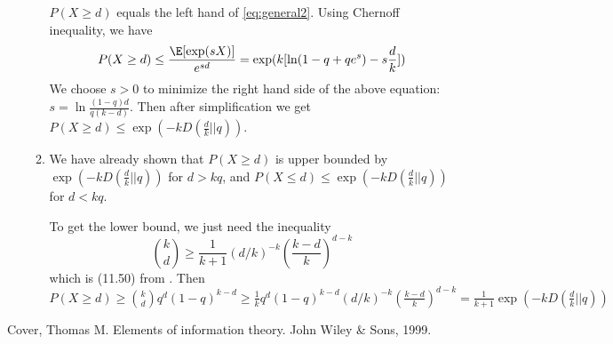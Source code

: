\documentclass{article}
\begin{document}
\begin{enumerate}
\begin{enumerate}
        $P(X \geq d)$ equals the left hand of \eqref{eq:general2}.
        Using Chernoff inequality, we have
        \begin{equation*}
            P(X\geq d) \leq \frac{\E[\exp(sX)]}{e^{sd}} = \exp(k[\ln(1-q+qe^s)-s\frac{d}{k}])
        \end{equation*}
        We choose $s>0$ to minimize the right hand side of the above equation: $s=\ln\frac{(1-q)d}{q(k-d)}$. Then after simplification
        we get $P(X\geq d) \leq \exp(-kD(\frac{d}{k}||q))$.
        \item We have already shown that $P(X \geq d)$ is upper bounded
        by $\exp(-kD(\frac{d}{k}||q))$ for $d>kq$, and $P(X \leq d)
        \leq \exp(-kD(\frac{d}{k}||q))$ for $d<kq$.
        
        To get the lower bound, we just need the inequality
        \begin{equation}
            \binom{k}{d} \geq \frac{1}{k+1} (d/k)^{-k} (\frac{k-d}{k})^{d-k}
        \end{equation}
        which is (11.50) from \cite{elements}.
        Then $P(X\geq d) \geq \binom{k}{d} q^d (1-q)^{k-d}
        \geq \frac{1}{k} q^d (1-q)^{k-d} (d/k)^{-k} (\frac{k-d}{k})^{d-k}
        =\frac{1}{k+1} \exp(-kD(\frac{d}{k}||q))$
        
        
        
    \end{enumerate}
\end{enumerate}
\begin{thebibliography}{9}
 Cover, Thomas M. Elements of information theory. John Wiley \& Sons, 1999.
\end{thebibliography}
\end{document}
